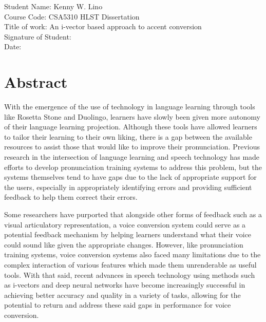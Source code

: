 \documentclass
[
    a4paper,
    twoside,
    12pt,
]
{report}
\begin{document}
       \vspace*{1.5cm}
	     Student Name: Kenny W. Lino \\
       Course Code: CSA5310 HLST Dissertation \\
       Title of work: An i-vector based approach to accent conversion \\

       \vspace*{1.0cm}
       Signature of Student: \\

       \vspace*{1.0cm}
       Date:

\newpage
\section*{Abstract}

With the emergence of the use of technology in language learning through
tools like Rosetta Stone and Duolingo, learners have slowly been given
more autonomy of their language learning projection. Although these
tools have allowed learners to tailor their learning to their own
liking, there is a gap between the available resources to assist those
that would like to improve their pronunciation. Previous research in the
intersection of language learning and speech technology has made efforts
to develop pronunciation training systems to address this problem, but
the systems themselves tend to have gaps due to the lack of appropriate
support for the users, especially in appropriately identifying errors
and providing sufficient feedback to help them correct their errors.

Some researchers have purported that alongside other forms of feedback
such as a visual articulatory representation, a voice conversion system
could serve as a potential feedback mechanism by helping learners
understand what their voice could sound like given the appropriate
changes. However, like pronunciation training systems, voice conversion
systems also faced many limitations due to the complex interaction of
various features which made them unrenderable as useful tools. With that
said, recent advances in speech technology using methods such as
i-vectors and deep neural networks have become increasingly successful
in achieving better accuracy and quality in a variety of tasks, allowing
for the potential to return and address these said gaps in performance
for voice conversion.
\end{document}
